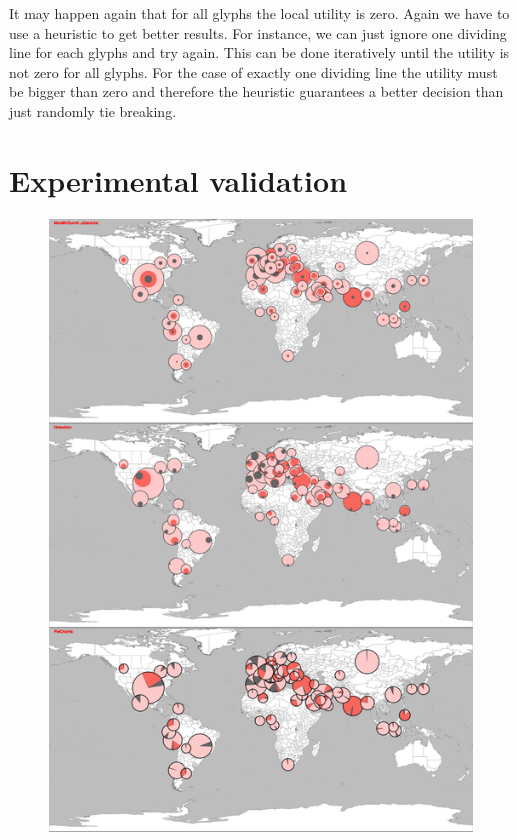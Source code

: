 \documentclass[a4paper,11pt]{article}
\begin{document}
It may happen again that for all glyphs the local utility is zero. Again we have to use a heuristic to get better results. For instance, we can just ignore one dividing line for each glyphs and try again. This can be done iteratively until the utility is not zero for all glyphs. For the case of exactly one dividing line the utility must be bigger than zero and therefore the heuristic guarantees a better decision than just randomly tie breaking.

\newpage

\section{Experimental validation}


\begin{figure}[htp]
  \includegraphics[width=\textwidth,height=\textheight,keepaspectratio]{assets/covid19_nested_discs.png}
\end{figure}
\end{document}
